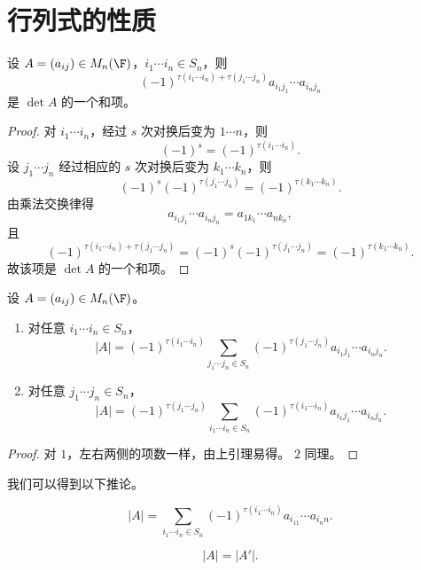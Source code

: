 \section{行列式的性质}

\begin{lemma}\label{3.7.1}
	设 $A=(a_{ij})\in M_n(\F)$，$i_1\cdots i_n\in S_n$，则
	\[
	(-1)^{\tau(i_1\cdots i_n)+\tau(j_1\cdots j_n)}
	a_{i_1j_1}\cdots a_{i_nj_n}
	\]
	是 $\det A$ 的一个和项。
\end{lemma}

\begin{proof}
	对 $i_1\cdots i_n$，经过 $s$ 次对换后变为 $1\cdots n$，则
	\[
	(-1)^s=(-1)^{\tau(i_1\cdots i_n)}.
	\]
	设 $j_1\cdots j_n$ 经过相应的 $s$ 次对换后变为 $k_1\cdots k_n$，则
	\[
	(-1)^s(-1)^{\tau(j_1\cdots j_n)}=(-1)^{\tau(k_1\cdots k_n)}.
	\]
	由乘法交换律得
	\[
	a_{i_1j_1}\cdots a_{i_nj_n}=a_{1k_1}\cdots a_{nk_n},
	\]
	且
	\[
	(-1)^{\tau(i_1\cdots i_n)+\tau(j_1\cdots j_n)}
	=(-1)^s(-1)^{\tau(j_1\cdots j_n)}
	=(-1)^{\tau(k_1\cdots k_n)}.
	\]
	故该项是 $\det A$ 的一个和项。
\end{proof}

\begin{proposition}\label{3.7.2}
	设 $A=(a_{ij})\in M_n(\F)$。
	\begin{enumerate}
		\item 对任意 $i_1\cdots i_n\in S_n$，
		\[
		|A|=(-1)^{\tau(i_1\cdots i_n)}
		\sum_{j_1\cdots j_n\in S_n}
		(-1)^{\tau(j_1\cdots j_n)}
		a_{i_1j_1}\cdots a_{i_nj_n}.
		\]
		\item 对任意 $j_1\cdots j_n\in S_n$，
		\[
		|A|=(-1)^{\tau(j_1\cdots j_n)}
		\sum_{i_1\cdots i_n\in S_n}
		(-1)^{\tau(i_1\cdots i_n)}
		a_{i_1j_1}\cdots a_{i_nj_n}.
		\]
	\end{enumerate}
\end{proposition}

\begin{proof}
	对 $1$，左右两侧的项数一样，由上引理易得。
	$2$ 同理。
\end{proof}

我们可以得到以下推论。

\begin{corollary}\label{3.7.3}
	\[
	|A|=
	\sum_{i_1\cdots i_n\in S_n}
	(-1)^{\tau(i_1\cdots i_n)}
	a_{i_11}\cdots a_{i_nn}.
	\]
\end{corollary}

\begin{corollary}\label{3.7.4}
	\[
	|A|=|A'|.
	\]
\end{corollary}

